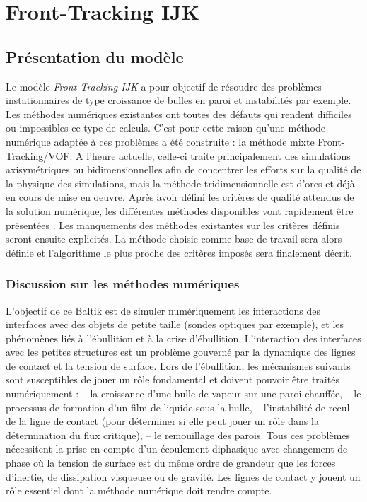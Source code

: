\newpage
{}
\chapter{\label{sec:FTIJK}Front-Tracking IJK}

\section{Pr\'esentation du mod\`ele}
Le mod\`ele \textit{Front-Tracking IJK} a pour objectif de r\'esoudre des probl\`emes instationnaires de type croissance de bulles en paroi et instabilit\'es par exemple. Les m\'ethodes num\'eriques existantes ont toutes des d\'efauts qui rendent difficiles ou impossibles ce type de calculs. C'est pour cette raison qu'une m\'ethode num\'erique adapt\'ee \`a ces probl\`emes a \'et\'e construite : la m\'ethode mixte Front-Tracking/VOF. A l'heure actuelle, celle-ci traite principalement des simulations axisym\'etriques ou bidimensionnelles afin de concentrer les efforts sur la qualit\'e de la physique des simulations, mais la m\'ethode tridimensionnelle est d'ores et d\'ej\`a en cours de mise en oeuvre.
Après avoir d\'efini les crit\`eres de qualit\'e attendus de la solution num\'erique, les diff\'erentes m\'ethodes disponibles vont rapidement \^etre pr\'esent\'ees . Les manquements des m\'ethodes existantes sur les crit\`eres d\'efinis seront ensuite explicit\'es. La m\'ethode choisie comme base de travail sera alors d\'efinie et l'algorithme le plus proche des crit\`eres impos\'es sera finalement d\'ecrit.

\subsection{Discussion sur les m\'ethodes num\'eriques}

L'objectif de ce Baltik est de simuler num\'eriquement les interactions des interfaces avec des objets de petite taille (sondes optiques par exemple), et les ph\'enomènes li\'es à l’\'ebullition et \`a la crise d’\'ebullition. L’interaction des interfaces avec les petites structures est un problème gouvern\'e par la dynamique des lignes de contact et la tension de surface.
Lors de l’\'ebullition, les m\'ecanismes suivants sont susceptibles de jouer un r\^ole fondamental et doivent pouvoir \^etre trait\'es num\'eriquement :
– la croissance d’une bulle de vapeur sur une paroi chauff\'ee,
– le processus de formation d’un film de liquide sous la bulle,
– l’instabilit\'e de recul de la ligne de contact (pour d\'eterminer si elle peut jouer un r\^ole dans la d\'etermination du flux critique),
– le remouillage des parois.
Tous ces probl\`emes n\'ecessitent la prise en compte d’un \'ecoulement diphasique avec changement de phase o\`u la tension de surface est du m\^eme ordre de grandeur que les forces d’inertie, de dissipation visqueuse ou de gravit\'e. Les lignes de contact y jouent un r\^ole essentiel dont la m\'ethode num\'erique doit rendre compte.
